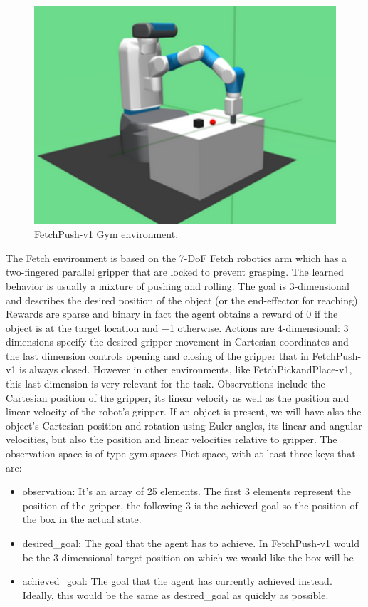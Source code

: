 \documentclass[a4paper]{report}
\begin{document}
\begin{figure}[h!]
\centering
\includegraphics[scale=0.5]{fetchpush.png}
\caption{\label{Fig: fetchpush} FetchPush-v1 Gym environment.}
\end{figure}

The Fetch environment is based on the 7-DoF Fetch robotics arm which has a two-fingered parallel gripper that are locked to prevent grasping. The learned behavior
is usually a mixture of pushing and rolling. The goal is 3-dimensional and describes the desired position of the object (or the end-effector for reaching). Rewards are sparse and binary in fact the agent obtains a reward of 0 if the object is at the target location and −1 otherwise. Actions are 4-dimensional: 3 dimensions specify the desired gripper movement in Cartesian coordinates and the last dimension controls opening and closing of the gripper that in FetchPush-v1 is always closed. However in other environments, like FetchPickandPlace-v1, this last dimension is very relevant for the task.
Observations include the Cartesian position of the gripper, its linear velocity as well as the position and linear velocity of the robot's gripper. If an object is present, we will have also the object's Cartesian position and rotation using Euler angles, its linear and angular velocities, but also the position and linear velocities relative to gripper.
The observation space is of type gym.spaces.Dict space, with at least three keys that are:
\begin{itemize}
\item observation: It's an array of 25 elements. The first 3 elements represent the position of the gripper, the following 3 is the achieved goal so the position of the box in the actual state. 
\item desired\_goal: The goal that the agent has to achieve. In FetchPush-v1 would be the 3-dimensional target position on which we would like the box will be
\item achieved\_goal: The goal that the agent has currently achieved instead. Ideally, this would be the same as desired\_goal as quickly as possible.
\end{itemize}
\end{document}
